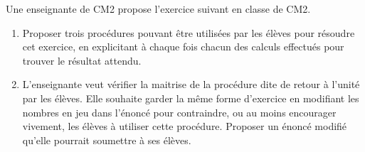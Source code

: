 \bigskip

\begin{exercice}[CRPE 2018 G3]
Une enseignante de CM2 propose l’exercice suivant en classe de CM2.
\begin{center}
\end{center}
\begin{enumerate}
  \item Proposer trois procédures pouvant être utilisées par les élèves pour résoudre cet exercice, en explicitant à chaque fois chacun des calculs effectués pour trouver le résultat attendu.
   \item L’enseignante veut vérifier la maitrise de la procédure dite de retour à l’unité par les élèves. Elle souhaite garder la même forme d’exercice en modifiant les nombres en jeu dans l’énoncé pour contraindre, ou au moins encourager vivement, les élèves à utiliser cette procédure. Proposer un énoncé modifié qu’elle pourrait soumettre à ses élèves.
\end{enumerate}
\end{exercice}


